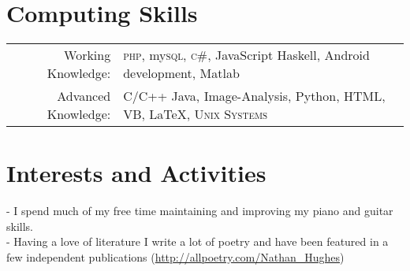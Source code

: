 \documentclass[a4paper,10pt]{article}
\begin{document}

\section{Computing Skills}
\begin{tabular}{rl}
  Working Knowledge:& \textsc{php}, my\textsc{sql}, \textsc{c\#}, JavaScript Haskell, Android development, Matlab  \\
  Advanced Knowledge:& C/C++ Java, Image-Analysis, Python, HTML, VB, \LaTeX, \textsc{Unix Systems}
\end{tabular}

\section{Interests and Activities}                                                                               
- I spend much of my free time maintaining and improving my piano and guitar skills.\\                                     
- Having a love of literature I write a lot of poetry and have been featured in a few independent  publications (\href{http://allpoetry.com/Nathan\_Hughes}{http://allpoetry.com/Nathan\_Hughes})
\end{document}
